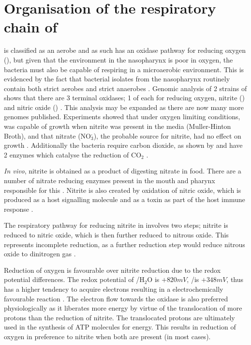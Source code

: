 \section{Organisation of the respiratory chain of \Nm}

\Nm\space is classified as an aerobe and as such has an oxidase pathway for reducing oxygen (\cOxygen), but given that the environment in the nasopharynx is poor in oxygen, the bacteria must also be capable of respiring in a microaerobic environment. This is evidenced by the fact that bacterial isolates from the nasopharynx routinely contain both strict aerobes and strict anaerobes \cite{Rock2005}. Genomic analysis of 2 strains of \Nm\space shows that there are 3 terminal oxidases; 1 of each for reducing oxygen, nitrite (\cNitrite) and nitric oxide (\cNO) \cite{Rock2005a}. This analysis may be expanded as there are now many more genomes published. Experiments showed that under oxygen limiting conditions, \Nm\space was capable of growth when nitrite was present in the media (Muller-Hinton Broth), and that nitrate (NO$_{\textrm{3}}^{\textrm{-}}$), the probable source for nitrite, had no effect on growth \cite{Rock2005a}. Additionally the bacteria require carbon dioxide, as shown by \citet{Tuttle1952} and have 2 enzymes which catalyse the reduction of CO$_{\textrm{2}}$ \cite{IWDeVoe06011982}.

\textit{In vivo}, nitrite is obtained as a product of digesting nitrate in food. There are a number of nitrate reducing enzymes present in the mouth and pharynx responsible for this \cite{Rock2005}. Nitrite is also created by oxidation of nitric oxide, which is produced as a host signalling molecule and as a toxin as part of the host immune response \cite{Lundberg2004,Rock2005}.

The respiratory pathway for reducing nitrite in \Nm\space involves two steps; nitrite is reduced to nitric oxide, which is then further reduced to nitrous oxide. This represents incomplete reduction, as a further reduction step would reduce nitrous oxide to dinitrogen gas \cite{Rock2005,Deeudom2006}.

Reduction of oxygen is favourable over nitrite reduction due to the redox potential differences. The redox potential of \cOxygen /H$_{\textrm{2}}$O is $+820mV$, \cNitrite /\cNO\space is $+348mV$, thus \cOxygen\space has a higher tendency to acquire electrons resulting in a electrochemically favourable reaction \cite{Deeudom2007}. The electron flow towards the oxidase is also preferred physiologically as it liberates more energy by virtue of the translocation of more protons than the reduction of nitrite. The translocated protons are ultimately used in the synthesis of ATP molecules for energy. This results in reduction of oxygen in preference to nitrite when both are present (in most cases).

